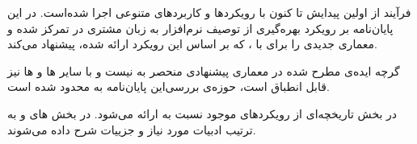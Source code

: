 
فرآیند  از اولین پیدایش تا کنون با رویکرد‌ها و کاربردهای
متنوعی اجرا شده‌است. در این پایان‌نامه بر رویکرد
بهره‌گیری از توصیف نرم‌افزار به زبان مشتری در  تمرکز شده و
معماری‌ جدیدی را برای  با  ، که بر اساس این
رویکرد ارائه شده، پیشنهاد می‌کند.

گرچه ایده‌ی مطرح شده در معماری پیشنهادی منحصر به  
 نیست و با سایر  ‌ها و ‌ها نیز قابل انطباق است،
حوزه‌ی بررسی‌این پایان‌نامه به   محدود شده
است.

در بخش  تاریخچه‌ای از رویکردهای موجود نسبت به
 ارائه می‌شود. در بخش ‌های  و
 به ترتیب ادبیات مورد نیاز و جزییات 
 شرح داده می‌شوند.









